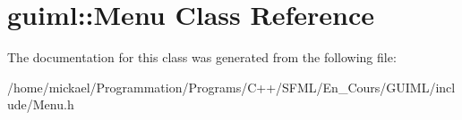 \section{guiml\-:\-:Menu Class Reference}
\label{classguiml_1_1_menu}


The documentation for this class was generated from the following file\-:\begin{DoxyCompactItemize}
\item 
/home/mickael/\-Programmation/\-Programs/\-C++/\-S\-F\-M\-L/\-En\-\_\-\-Cours/\-G\-U\-I\-M\-L/include/Menu.\-h\end{DoxyCompactItemize}
